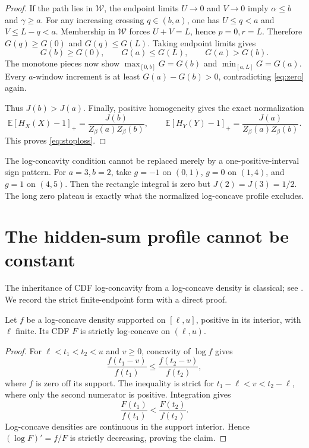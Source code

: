 \documentclass[11pt,a4paper]{article}
\theoremstyle{remark}\newtheorem*{ednote}{Editorial note (ProveIt, 2026-10-01)}
\newcommand{\E}{\mathbb E}\newcommand{\R}{\mathbb R}
\begin{document}
\begin{proof}
If the path lies in $\mathcal W$, the endpoint limits $U\to0$ and $V\to0$ imply $\alpha\le b$ and $\gamma\ge a$. For any increasing crossing $q\in(b,a)$, one has $U\le q<a$ and $V\le L-q<a$. Membership in $\mathcal W$ forces $U+V=L$, hence $p=0,r=L$. Therefore $G(q)\ge G(0)$ and $G(q)\le G(L)$. Taking endpoint limits gives
\[
 G(b)\ge G(0),\qquad G(a)\le G(L),\qquad G(a)>G(b).
\]
The monotone pieces now show $\max_{[0,b]}G=G(b)$ and $\min_{[a,L]}G=G(a)$. Every $a$-window increment is at least $G(a)-G(b)>0$, contradicting \eqref{eq:zero} again.

Thus $J(b)>J(a)$. Finally, positive homogeneity gives the exact normalization
\begin{equation}\label{eq:normalization}
 \E[H_X(X)-1]_+
 =\frac{J(b)}{Z_\beta(a)Z_\beta(b)},\qquad
 \E[H_Y(Y)-1]_+
 =\frac{J(a)}{Z_\beta(a)Z_\beta(b)}.
\end{equation}
This proves \eqref{eq:stoploss}.
\end{proof}

The log-concavity condition cannot be replaced merely by a one-positive-interval sign pattern. For $a=3,b=2$, take $g=-1$ on $(0,1)$, $g=0$ on $(1,4)$, and $g=1$ on $(4,5)$. Then the rectangle integral is zero but $J(2)=J(3)=1/2$. The long zero plateau is exactly what the normalized log-concave profile excludes.

\section{The hidden-sum profile cannot be constant}
The inheritance of CDF log-concavity from a log-concave density is classical; see \cite{Bagnoli,Prekopa}. We record the strict finite-endpoint form with a direct proof.

\begin{lemma}\label{lem:cdf}
Let $f$ be a log-concave density supported on $[\ell,u]$, positive in its interior, with $\ell$ finite. Its CDF $F$ is strictly log-concave on $(\ell,u)$.
\end{lemma}
\begin{proof}
For $\ell<t_1<t_2<u$ and $v\ge0$, concavity of $\log f$ gives
\[
 \frac{f(t_1-v)}{f(t_1)}\le\frac{f(t_2-v)}{f(t_2)},
\]
where $f$ is zero off its support. The inequality is strict for $t_1-\ell<v<t_2-\ell$, where only the second numerator is positive. Integration gives
\[
 \frac{F(t_1)}{f(t_1)}<\frac{F(t_2)}{f(t_2)}.
\]
Log-concave densities are continuous in the support interior. Hence $(\log F)'=f/F$ is strictly decreasing, proving the claim.
\end{proof}
\end{document}
